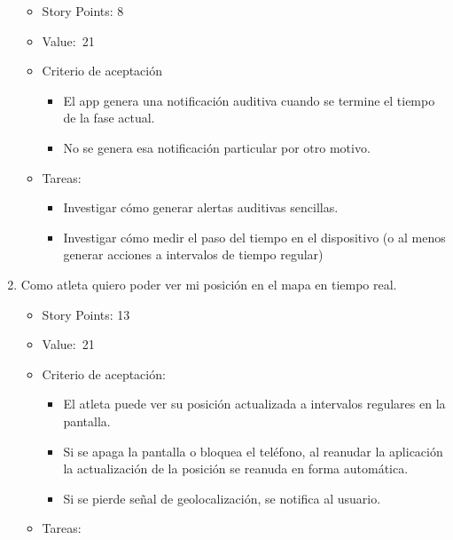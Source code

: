 \begin{enumerate}
  \begin{itemize}
  \item
    Story Points: 8
  \item
    Value:~21
  \item
    Criterio de aceptación

    \begin{itemize}
    \item
      El app genera una notificación auditiva cuando se termine el
      tiempo de la fase actual.
    \item
      No se genera esa notificación particular por otro motivo.
    \end{itemize}
  \item
    Tareas:

    \begin{itemize}
    \item
      Investigar cómo generar alertas auditivas sencillas.
    \item
      Investigar cómo medir el paso del tiempo en el dispositivo (o al
      menos generar acciones a intervalos de tiempo regular)
    \end{itemize}
  \end{itemize}
\item
  Como atleta quiero poder ver mi posición en el mapa en tiempo real.

  \begin{itemize}
  \item
    Story Points: 13
  \item
    Value:~21
  \item
    Criterio de aceptación:

    \begin{itemize}
    \item
      El atleta puede ver su posición actualizada a intervalos regulares
      en la pantalla.
    \item
      Si se apaga la pantalla o bloquea el teléfono, al reanudar la
      aplicación la actualización de la posición se reanuda en forma
      automática.
    \item
      Si se pierde señal de geolocalización, se notifica al usuario.
    \end{itemize}
  \item
    Tareas:


\end{itemize}
\end{enumerate}
